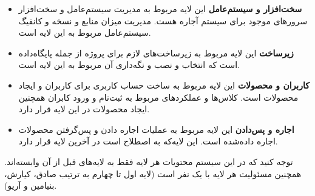 \begin{itemize}
\item \textbf{سخت‌افزار و سیستم‌عامل}
این لایه مربوط به مدیریت سیستم‌عامل و سخت‌افزار سرورهای موجود برای سیستم آجاره هست. مدیریت میزان منابع و نسخه و کانفیگ سیستم‌عامل مربوط به این لایه است.

\item \textbf{زیرساخت}
این لایه مربوط به زیرساخت‌های لازم برای پروژه از جمله پایگاه‌داده
است که انتخاب و نصب و نگه‌داری آن مربوط به این لایه است.

\item \textbf{کاربران و محصولات}
این لایه مربوط به ساخت حساب کاربری برای کاربران و ایجاد محصولات است. کلاس‌ها و عملکردهای مربوط به ثبت‌نام و ورود کابران همچنین ایجاد محصولات در این لایه قرار دارد.

\item \textbf{اجاره و پس‌دادن}
این لایه مربوط به عملیات اجاره دادن و پس‌گرفتن محصولات اجاره داده‌شده است. این لایه‌که به اصطلاح 
است در آخرین لایه قرار دارد.


\end{itemize}

توجه کنید که در این سیستم محتویات هر لایه فقط به لایه‌های قبل از آن وابسته‌اند. همچنین مسئولیت هر لایه با یک نفر است (لایه اول تا چهارم به ترتیب صادق، کیارش، بنیامین و آریو).


